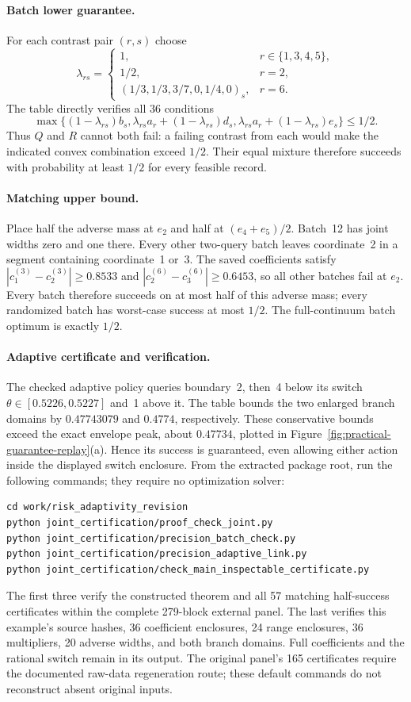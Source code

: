 \documentclass[12pt]{article}
\begin{document}
\paragraph{Batch lower guarantee.}
For each contrast pair $(r,s)$ choose
\[
 \lambda_{rs}=\begin{cases}
 1,&r\in\{1,3,4,5\},\\
 1/2,&r=2,\\
 (1/3,1/3,3/7,0,1/4,0)_s,&r=6.
 \end{cases}
\]
The table directly verifies all 36 conditions
\[
 \max\{(1-\lambda_{rs})b_s,
 \lambda_{rs}a_r+(1-\lambda_{rs})d_s,
 \lambda_{rs}a_r+(1-\lambda_{rs})e_s\}\leq1/2.
\]
Thus $Q$ and $R$ cannot both fail: a failing contrast from each would make
the indicated convex combination exceed $1/2$.  Their equal mixture
therefore succeeds with probability at least $1/2$ for every feasible record.

\paragraph{Matching upper bound.}
Place half the adverse mass at $e_2$ and half at $(e_4+e_5)/2$.
Batch~12 has joint widths zero and one there.  Every other two-query
batch leaves coordinate~2 in a segment containing coordinate~1 or~3.
The saved coefficients satisfy
$|c^{(3)}_1-c^{(3)}_2|\geq0.8533$ and
$|c^{(6)}_2-c^{(6)}_3|\geq0.6453$, so all other batches fail at $e_2$.
Every batch therefore succeeds on at most half of this adverse mass;
every randomized batch has worst-case success at most $1/2$.
The full-continuum batch optimum is exactly $1/2$.

\paragraph{Adaptive certificate and verification.}
The checked adaptive policy queries boundary~2, then~4 below its switch
$\theta\in[0.5226,0.5227]$ and~1 above it.  The table bounds the two
enlarged branch domains by $0.47743079$ and $0.4774$, respectively.
These conservative bounds exceed the exact envelope peak, about $0.47734$,
plotted in Figure~\ref{fig:practical-guarantee-replay}(a).
Hence its success is guaranteed, even allowing either action inside the
displayed switch enclosure.
From the extracted package root, run the following commands; they require
no optimization solver:
\begin{verbatim}
cd work/risk_adaptivity_revision
python joint_certification/proof_check_joint.py
python joint_certification/precision_batch_check.py
python joint_certification/precision_adaptive_link.py
python joint_certification/check_main_inspectable_certificate.py
\end{verbatim}
The first three verify the constructed theorem and all 57 matching
half-success certificates within the complete 279-block external panel.
The last verifies this example's source hashes, 36 coefficient enclosures,
24 range enclosures, 36 multipliers, 20 adverse widths, and both branch
domains.  Full coefficients and the rational switch remain in its output.
The original panel's 165 certificates require the documented raw-data
regeneration route; these default commands do not reconstruct absent
original inputs.
\end{document}

